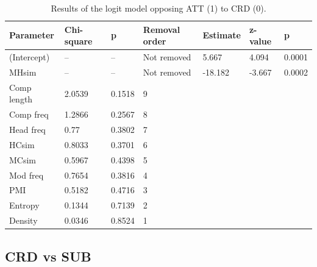 \begin{table}[t!]
\centering
\small
\begin{tabular}{|l|l|l|l|l|l|l|}
\hline
Parameter   & Chi-square & p      & Removal order & Estimate & z-value & p      \\ \hline
(Intercept) & --       & --     & Not removed   & 5.667    & 4.094   & 0.0001 \\
MHsim       & --       & --     & Not removed   & -18.182  & -3.667  & 0.0002 \\
Comp length & 2.0539   & 0.1518 & 9             &          &         &        \\
Comp freq   & 1.2866   & 0.2567 & 8             &          &         &        \\
Head freq   & 0.77     & 0.3802 & 7             &          &         &        \\
HCsim       & 0.8033   & 0.3701 & 6             &          &         &        \\
MCsim       & 0.5967   & 0.4398 & 5             &          &         &        \\
Mod freq    & 0.7654   & 0.3816 & 4             &          &         &        \\
PMI         & 0.5182   & 0.4716 & 3             &          &         &        \\
Entropy     & 0.1344   & 0.7139 & 2             &          &         &        \\
Density     & 0.0346   & 0.8524 & 1             &          &         &        \\ \hline
\end{tabular}
\caption{Results of the logit model opposing ATT (1) to CRD (0).}
\label{tab:resattcrd}
\end{table}

\subsection{CRD vs SUB}

